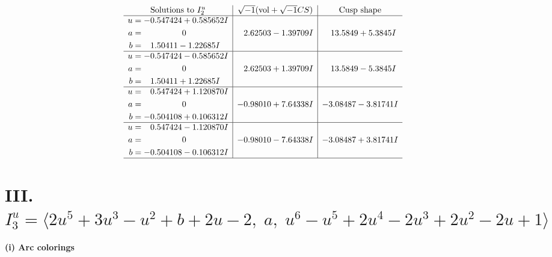 \documentclass[1p]{elsarticle_modified}
\theoremstyle{definition}
\newcommand{\I}{\sqrt{-1}}
\begin{document}
$$\begin{array}{c|c|c}  
\text{Solutions to }I^u_{2}& \I (\text{vol} + \sqrt{-1}CS) & \text{Cusp shape}\\
 \hline 
\begin{aligned}
u &= -0.547424 + 0.585652 I \\
a &= \phantom{-0.000000 } 0 \\
b &= \phantom{-}1.50411 - 1.22685 I\end{aligned}
 & \phantom{-}2.62503 - 1.39709 I & \phantom{-}13.5849 + 5.3845 I \\ \hline\begin{aligned}
u &= -0.547424 - 0.585652 I \\
a &= \phantom{-0.000000 } 0 \\
b &= \phantom{-}1.50411 + 1.22685 I\end{aligned}
 & \phantom{-}2.62503 + 1.39709 I & \phantom{-}13.5849 - 5.3845 I \\ \hline\begin{aligned}
u &= \phantom{-}0.547424 + 1.120870 I \\
a &= \phantom{-0.000000 } 0 \\
b &= -0.504108 + 0.106312 I\end{aligned}
 & -0.98010 + 7.64338 I & -3.08487 - 3.81741 I \\ \hline\begin{aligned}
u &= \phantom{-}0.547424 - 1.120870 I \\
a &= \phantom{-0.000000 } 0 \\
b &= -0.504108 - 0.106312 I\end{aligned}
 & -0.98010 - 7.64338 I & -3.08487 + 3.81741 I\\
 \hline 
 \end{array}$$\newpage\newpage\renewcommand{\arraystretch}{1}
\centering \section*{III. $I^u_{3}= \langle 2 u^5+3 u^3- u^2+b+2 u-2,\;a,\;u^6- u^5+2 u^4-2 u^3+2 u^2-2 u+1 \rangle$}
\flushleft \textbf{(i) Arc colorings}\\
\end{document}
